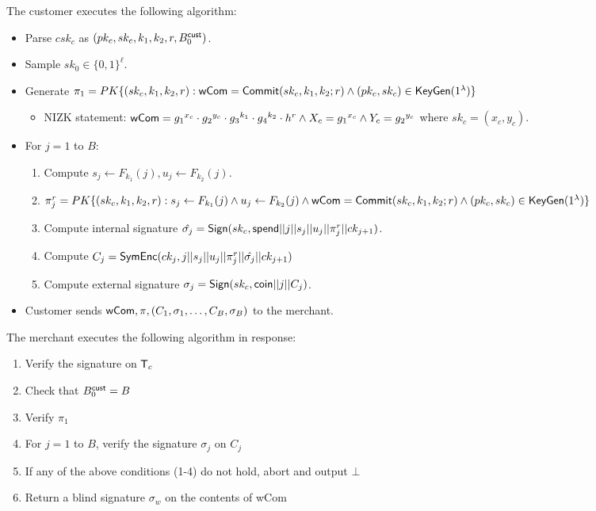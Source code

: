 \documentclass[11pt]{report}
\newcommand{\BC}{B^{\text{\sf cust}}_{\text{0}}}
\begin{document}
\begin{enumerate}
\medskip \noindent
The customer executes the following algorithm:
\begin{itemize}
\item Parse $csk_c$ as $(pk_c, sk_c, k_1, k_2, r, \BC)$.
\item Sample $sk_0 \in \{0,1\}^\ell$.
\item Generate $\pi_1 = PK\{ (sk_c, k_1, k_2, r) : {\sf wCom} = {\sf Commit}(sk_c, k_1, k_2; r) \wedge (pk_c, sk_c) \in {\sf KeyGen}(1^\lambda)\}$
\begin{itemize}
\item {\sf NIZK} statement: ${\sf wCom} = {g_1}^{x_c} \cdot {g_2}^{y_c} \cdot {g_3}^{k_1} \cdot {g_4}^{k_2} \cdot h^r \wedge X_c = {g_1}^{x_c} \wedge Y_c = {g_2}^{y_c}$  where $sk_c = (x_c, y_c)$.
\end{itemize}
\item For $j  = 1$ to $B$:
\begin{enumerate}
\item Compute $s_j  \leftarrow F_{k_1}(j), u_j \leftarrow F_{k_2}(j)$.
\item $\pi_{j}^r = PK\{ (sk_c, k_1, k_2, r) : s_j  \leftarrow F_{k_1}(j) \wedge u_j \leftarrow F_{k_2}(j) \\ \wedge {\sf wCom} = {\sf Commit}(sk_c, k_1, k_2; r)  \\ \wedge (pk_c, sk_c) \in {\sf KeyGen}(1^\lambda)\}$
\item Compute internal signature $\hat{\sigma_j} = {\sf Sign}(sk_c, {\sf spend}||j||s_j||u_j||\pi_{j}^r||ck_{j+1})$.
\item Compute $C_j = {\sf SymEnc}(ck_j, j||s_j||u_j||\pi_{j}^r||\hat{\sigma_j}||ck_{j+1})$
\item Compute external signature $\sigma_j = {\sf Sign}(sk_c, {\sf coin}||j||C_j)$.
\end{enumerate}
\item Customer sends ${\sf wCom}, \pi, (C_1, \sigma_1,\dots,C_B,\sigma_B)$ to the merchant.
\end{itemize}

\noindent
The merchant executes the following algorithm in response:
\begin{enumerate}
\item Verify the signature on ${\sf T}_c$
\item Check that $\BC = B$
\item Verify $\pi_1$
\item For $j = 1$ to $B$, verify the signature $\sigma_j$ on $C_j$
\item If any of the above conditions (1-4) do not hold, abort and output $\bot$
\item Return a blind signature $\sigma_w$ on the contents of {\sf wCom}
\end{enumerate}


\end{enumerate}
\end{document}

